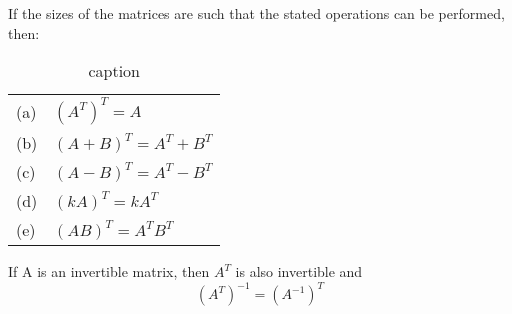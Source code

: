 \begin{theorem}[]
	If the sizes of the matrices are such that the stated operations can be performed, then:
	\begin{table}[htpb]
		\centering
		\caption{caption}
		\label{tab:label}
		\begin{tabular}{l l}
			(a)	 &  $(A^{T})^{T} = A$ \\
			(b)	 &  $(A+B)^{T} = A^{T} + B^{T}$ \\
			(c)	 &  $(A-B)^{T} = A^{T} - B^{T}$ \\
			(d)	 &  $(kA)^{T} =kA^{T}$ \\
			(e)	 &  $(AB)^{T} = A^{T}B^{T}$ \\
		\end{tabular}
	\end{table}
\end{theorem}

\begin{theorem}[]
	If A is an invertible matrix, then $A^{T}$ is also invertible and
	\[(A^{T})^{-1} = (A^{-1})^{T}\]
\end{theorem}



\newpage


